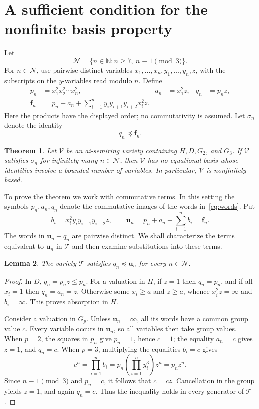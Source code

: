 \documentclass[11pt,reqno]{amsart}
\newtheorem{theorem}{Theorem}[section]
\newtheorem{lemma}[theorem]{Lemma}
\theoremstyle{remark}
\newcommand{\T}{\mathcal T}
\newcommand{\Ncal}{\mathcal N}
\newcommand{\bu}{\mathbf u}
\newcommand{\bfam}{\mathbf f}
\numberwithin{equation}{section}
\begin{document}
\section{A sufficient condition for the nonfinite basis property}
\label{sec:criterion}

Let
\[
\Ncal=\{n\in\mathbb N:n\geq7,\ n\equiv1\pmod3\}.
\]
For $n\in\Ncal$, use pairwise distinct variables
$x_1,\ldots,x_n,y_1,\ldots,y_n,z$, with the subscripts on the $y$-variables
read modulo $n$. Define
\begin{align}
p_n&=x_1^2x_2^2\cdots x_n^2,& a_n&=x_1^2z,& q_n&=p_nz,
\label{eq:words}\\
\bfam_n&=p_n+a_n+\sum_{i=1}^n y_i y_{i+1}y_{i+2}x_i^2z.
\label{eq:family}
\end{align}
Here the products have the displayed order; no commutativity is assumed.
Let $\sigma_n$ denote the identity
\begin{equation}\label{eq:sigma}
q_n\preceq\bfam_n.
\end{equation}

\begin{theorem}\label{thm:criterion}
Let $\mathcal V$ be an ai-semiring variety containing $H,D,G_2$, and
$G_3$. If $\mathcal V$ satisfies $\sigma_n$ for infinitely many
$n\in\Ncal$, then $\mathcal V$ has no equational basis whose identities
involve a bounded number of variables. In particular, $\mathcal V$ is
nonfinitely based.
\end{theorem}

To prove the theorem we work with commutative terms. In this setting the
symbols $p_n,a_n,q_n$ denote the commutative images of the words
in~\eqref{eq:words}. Put
\begin{equation}\label{eq:u}
b_i=x_i^2y_i y_{i+1}y_{i+2}z,\qquad
\bu_n=p_n+a_n+\sum_{i=1}^n b_i=\overline{\bfam_n}.
\end{equation}
The words in $\bu_n+q_n$ are pairwise distinct. We shall characterize the
terms equivalent to $\bu_n$ in $\T$ and then examine substitutions into
these terms.

\begin{lemma}\label{lem:validT}
The variety $\T$ satisfies $q_n\preceq\bu_n$ for every $n\in\Ncal$.
\end{lemma}
\begin{proof}
In $D$, $q_n=p_nz\leq p_n$. For a valuation in $H$, if $z=1$ then
$q_n=p_n$, and if all $x_i=1$ then $q_n=a_n=z$. Otherwise some
$x_i\geq a$ and $z\geq a$, whence $x_i^2z=\infty$ and $b_i=\infty$.
This proves absorption in $H$.

Consider a valuation in $G_p$. Unless $\bu_n=\infty$, all its words
have a common group value $c$. Every variable occurs in $\bu_n$, so all
variables then take group values. When $p=2$, the squares in $p_n$ give
$p_n=1$, hence $c=1$; the equality $a_n=c$ gives $z=1$, and $q_n=c$.
When $p=3$, multiplying the equalities $b_i=c$ gives
\[
c^n=\prod_{i=1}^n b_i
=p_n\left(\prod_{i=1}^n y_i^3\right)z^n=p_nz^n.
\]
Since $n\equiv1\pmod3$ and $p_n=c$, it follows that $c=cz$. Cancellation
in the group yields $z=1$, and again $q_n=c$. Thus the inequality holds
in every generator of $\T$.
\end{proof}
\end{document}
